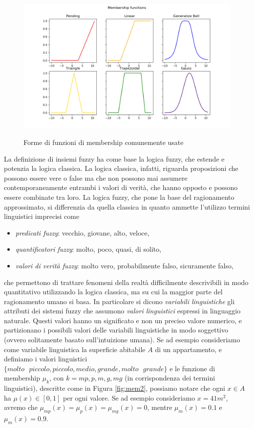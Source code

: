 \documentclass[oneside, openany]{book}
\begin{document}
		\begin{figure}[h]
			\centering
			{\includegraphics[width=.90\textwidth]{membership.png}} \quad
			\caption{Forme di funzioni di membership comunemente usate}
			\label{fig:membership}
			
		\end{figure}
	
		La definizione di insiemi fuzzy ha come base la logica fuzzy, che estende e potenzia la logica classica. La logica classica, infatti, riguarda proposizioni che possono essere vere o false ma che non possono mai assumere contemporaneamente entrambi i valori di verità, che hanno opposto e possono essere combinate tra loro.
		La logica fuzzy, che pone la base del ragionamento approssimato, si differenzia da quella classica in quanto ammette l'utilizzo termini linguistici imprecisi come
		\begin{itemize}
			\item{\textit{predicati fuzzy}}: vecchio, giovane, alto, veloce,
			\item{\textit{quantificatori fuzzy}}: molto, poco, quasi, di solito,
			\item{\textit{valori di verità fuzzy}}: molto vero, probabilmente falso, sicuramente falso,
		\end{itemize}	
		che permettono di trattare fenomeni della realtà difficilmente descrivibili in modo quantitativo utilizzando la logica classica, ma su cui la maggior parte del ragionamento umano si basa.
		In particolare si dicono \textit{variabili linguistiche} gli attributi dei sistemi fuzzy che assumono \textit{valori linguistici} espressi in linguaggio naturale. Questi valori hanno un significato e non un preciso valore numerico, e partizionano i possibili valori delle variabili linguistiche in modo soggettivo (ovvero solitamente basato sull'intuizione umana).
		Se ad esempio consideriamo come variabile linguistica la superficie abitabile $A$ di un appartamento, e definiamo i valori linguistici $\{molto\text{ }piccolo, piccolo, medio, grande, molto\text{ }grande\}$ e le funzione di membership $\mu_{k}$, con $k={mp, p, m, g, mg}$ (in corrispondenza dei termini linguistici), descritte come in Figura \ref{fig:mem2}, possiamo notare che ogni $x \in A$ ha $\mu(x) \in [0,1]$ per ogni valore. Se ad esempio consideriamo $x=41m^2$, avremo che $\mu_{mp}(x)=\mu_p(x)=\mu_{mg}(x)=0$, mentre $\mu_m(x)=0.1$ e $\mu_m(x)=0.9$.
		
\end{document}
